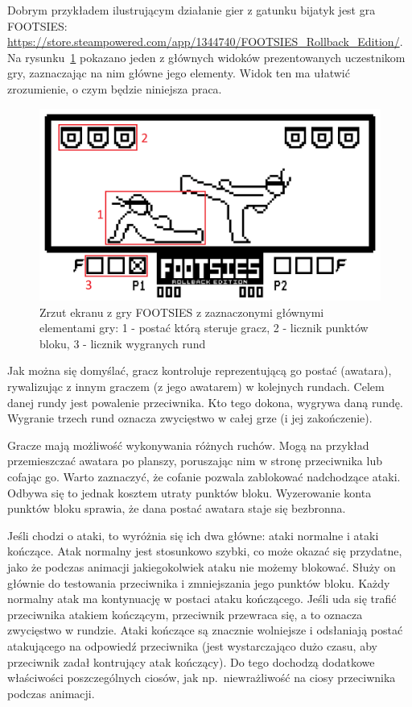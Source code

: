 Dobrym przykładem ilustrującym działanie gier z gatunku bijatyk jest gra FOOTSIES: \url{https://store.steampowered.com/app/1344740/FOOTSIES_Rollback_Edition/}. 
Na rysunku~\ref{fig:footsies} pokazano jeden z głównych widoków prezentowanych uczestnikom gry, zaznaczając na nim główne jego elementy. Widok ten ma ułatwić zrozumienie, o czym będzie niniejsza praca. 
\begin{figure}
	\centering
		\includegraphics[width=0.64\linewidth]{rys01/footsies}
	\caption{Zrzut ekranu z gry FOOTSIES z zaznaczonymi głównymi elementami gry: 1 - postać którą steruje gracz, 2 - licznik punktów bloku, 3 - licznik wygranych rund}
	\label{fig:footsies}
\end{figure}

Jak można się domyślać, gracz kontroluje reprezentującą go postać (awatara), rywalizując z innym graczem (z jego awatarem) w kolejnych rundach. Celem danej rundy jest powalenie przeciwnika. Kto tego dokona, wygrywa daną rundę. Wygranie trzech rund oznacza zwycięstwo w całej grze (i jej zakończenie).

Gracze mają możliwość wykonywania różnych ruchów. Mogą na przykład przemieszczać awatara po planszy, poruszając nim w stronę przeciwnika lub cofając go. Warto zaznaczyć, że cofanie pozwala zablokować nadchodzące ataki. Odbywa się to jednak kosztem utraty punktów bloku. Wyzerowanie konta punktów bloku sprawia, że dana postać awatara staje się bezbronna.

Jeśli chodzi o ataki, to wyróżnia się ich dwa główne: ataki normalne i ataki kończące. Atak normalny jest stosunkowo szybki, co może okazać się przydatne, jako że podczas animacji jakiegokolwiek ataku nie możemy blokować. Służy on głównie do testowania przeciwnika i zmniejszania jego punktów bloku. Każdy normalny atak ma kontynuację w postaci ataku kończącego. Jeśli uda się trafić przeciwnika atakiem kończącym, przeciwnik przewraca się, a to oznacza zwycięstwo w rundzie. Ataki kończące są znacznie wolniejsze i odsłaniają postać atakującego na odpowiedź przeciwnika (jest wystarczająco dużo czasu, aby przeciwnik zadał kontrujący atak kończący). Do tego dochodzą dodatkowe właściwości poszczególnych ciosów, jak np.\ niewrażliwość na ciosy przeciwnika podczas animacji.

